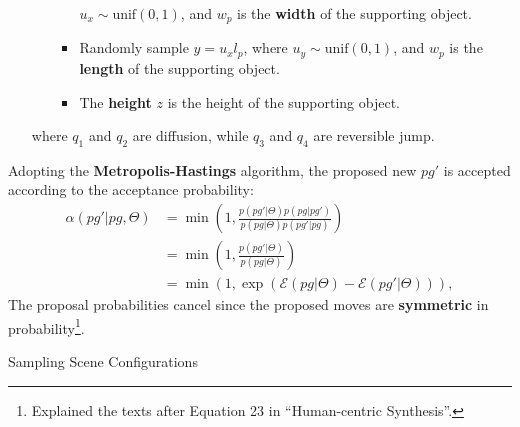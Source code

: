 \documentclass[10pt]{article}
\begin{document}
\begin{enumerate}
\begin{enumerate}
\begin{itemize}
            $u_x \sim \text{unif}(0, 1)$, and $w_p$ is the \textbf{width} of
            the supporting object.
          \item Randomly sample $y = u_x l_p$, where
            $u_y \sim \text{unif}(0, 1)$, and $w_p$ is the \textbf{length} of
            the supporting object.
          \item The \textbf{height} $z$ is the height of the supporting object.
        \end{itemize}
    \end{enumerate}
    where $q_1$ and $q_2$ are diffusion, while $q_3$ and $q_4$ are reversible
    jump.
\end{enumerate}

Adopting the \textbf{Metropolis-Hastings} algorithm, the proposed new
$pg\prime$ is accepted according to the acceptance probability:
%
\begin{align}
  \alpha(pg\prime \vert pg, \Theta) &= \min(1, \frac{p(pg\prime \vert \Theta) p(pg \vert pg\prime)}{p(pg\vert \Theta) p(pg\prime \vert pg)}) \label{eq:34} \\
                                    &= \min(1, \frac{p(pg\prime \vert \Theta)}{p(pg\vert \Theta)}) \label{eq:35} \\
                                    &= \min(1, \exp(\mathcal{E}(pg \vert \Theta) - \mathcal{E}(pg\prime \vert \Theta))), \label{eq:36}
\end{align}
%
The proposal probabilities cancel since the proposed moves are
\textbf{symmetric} in probability\footnote{Explained the texts after Equation
23 in ``Human-centric Synthesis''.}.

\begin{algorithm}[H]
  \caption{Sampling Scene Configurations}
\end{algorithm}
\end{document}
